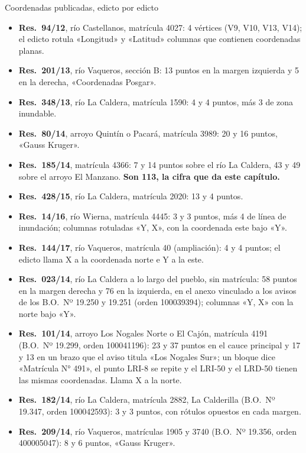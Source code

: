 \begin{ficha}{Coordenadas publicadas, edicto por edicto}
\begin{itemize}[leftmargin=*,nosep]
\item \textbf{Res.\ 94/12}, río Castellanos, matrícula 4027: 4 vértices (V9, V10, V13, V14); el edicto rotula «Longitud» y «Latitud» columnas que contienen coordenadas planas.
\item \textbf{Res.\ 201/13}, río Vaqueros, sección B: 13 puntos en la margen izquierda y 5 en la derecha, «Coordenadas Posgar».
\item \textbf{Res.\ 348/13}, río La Caldera, matrícula 1590: 4 y 4 puntos, más 3 de zona inundable.
\item \textbf{Res.\ 80/14}, arroyo Quintín o Pacará, matrícula 3989: 20 y 16 puntos, «Gauss Kruger».
\item \textbf{Res.\ 185/14}, matrícula 4366: 7 y 14 puntos sobre el río La Caldera, 43 y 49 sobre el arroyo El Manzano. \textbf{Son 113, la cifra que da este capítulo.}
\item \textbf{Res.\ 428/15}, río La Caldera, matrícula 2020: 13 y 4 puntos.
\item \textbf{Res.\ 14/16}, río Wierna, matrícula 4445: 3 y 3 puntos, más 4 de línea de inundación; columnas rotuladas «Y, X», con la coordenada este bajo «Y».
\item \textbf{Res.\ 144/17}, río Vaqueros, matrícula 40 (ampliación): 4 y 4 puntos; el edicto llama X a la coordenada norte e Y a la este.
\item \textbf{Res.\ 023/14}, río La Caldera a lo largo del pueblo, sin matrícula: 58 puntos en la margen derecha y 76 en la izquierda, en el anexo vinculado a los avisos de los B.O.\ Nº 19.250 y 19.251 (orden 100039394); columnas «Y, X» con la norte bajo «Y».
\item \textbf{Res.\ 101/14}, arroyo Los Nogales Norte o El Cajón, matrícula 4191 (B.O.\ Nº 19.299, orden 100041196): 23 y 37 puntos en el cauce principal y 17 y 13 en un brazo que el aviso titula «Los Nogales Sur»; un bloque dice «Matrícula N° 491», el punto LRI-8 se repite y el LRI-50 y el LRD-50 tienen las mismas coordenadas. Llama X a la norte.
\item \textbf{Res.\ 182/14}, río La Caldera, matrícula 2882, La Calderilla (B.O.\ Nº 19.347, orden 100042593): 3 y 3 puntos, con rótulos opuestos en cada margen.
\item \textbf{Res.\ 209/14}, río Vaqueros, matrículas 1905 y 3740 (B.O.\ Nº 19.356, orden 400005047): 8 y 6 puntos, «Gauss Kruger».

\end{itemize}
\end{ficha}
